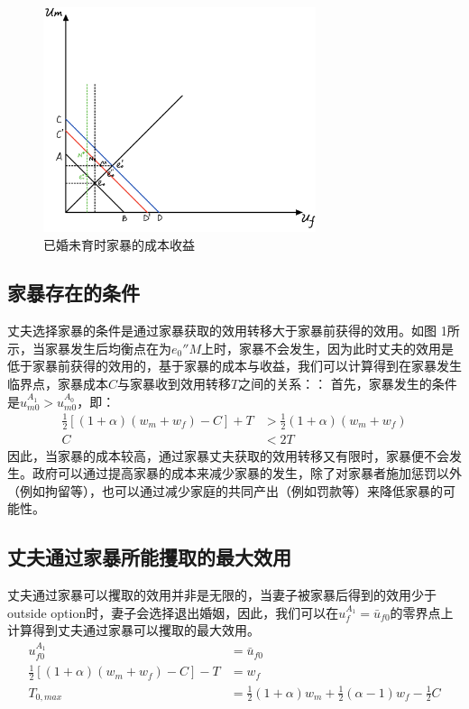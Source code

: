 \documentclass[a4paper,zihao=-4,UTF8]{ctexart}
\begin{document}
\begin{figure}[htbp]
	\centering
	\includegraphics[width=80mm]{pic/figure1.png}
	\caption{已婚未育时家暴的成本收益}
\end{figure}

	\subsection*{家暴存在的条件}
	丈夫选择家暴的条件是通过家暴获取的效用转移大于家暴前获得的效用。如图 1所示，当家暴发生后均衡点在为$e_0''M$上时，家暴不会发生，因为此时丈夫的效用是低于家暴前获得的效用的，基于家暴的成本与收益，我们可以计算得到在家暴发生临界点，家暴成本$C$与家暴收到效用转移$T$之间的关系：：
	首先，家暴发生的条件是$u_{m0}^{A_1}>u_{m0}^{A_0}$，即：
	\begin{equation}
		\begin{aligned}
			\frac{1}{2}[(1+\alpha)(w_m+w_f)-C]+T &> \frac{1}{2}(1+\alpha)(w_m+w_f) \\
			C &< 2T
		\end{aligned}
	\end{equation}
	因此，当家暴的成本较高，通过家暴丈夫获取的效用转移又有限时，家暴便不会发生。政府可以通过提高家暴的成本来减少家暴的发生，除了对家暴者施加惩罚以外（例如拘留等），也可以通过减少家庭的共同产出（例如罚款等）来降低家暴的可能性。

	\subsection*{丈夫通过家暴所能攫取的最大效用}
	丈夫通过家暴可以攫取的效用并非是无限的，当妻子被家暴后得到的效用少于outside option时，妻子会选择退出婚姻，因此，我们可以在$u_f^{A_1}=	\bar{u}_{f0}$的零界点上计算得到丈夫通过家暴可以攫取的最大效用。
	\begin{equation}
		\begin{aligned}
			u_{f0}^{A_1}  &=	\bar{u}_{f0}  \\
			\frac{1}{2}[(1+\alpha)(w_m+w_f)-C]-T &= w_f  \\
			T_{0,max}&=\frac{1}{2}(1+\alpha)w_m+\frac{1}{2}(\alpha -1) w_f-\frac{1}{2}C
		\end{aligned}
	\end{equation}
	
\end{document}
